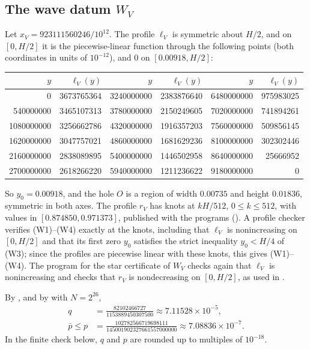 \documentclass[11pt,colorlinks]{charlie}
\begin{document}
\subsection{The wave datum $W_V$}
Let $x_V=923111560246/10^{12}$. The profile $\ell_V$ is symmetric about $H/2$, and on $[0,H/2]$ it is the piecewise-linear function through the following points (both coordinates in units of $10^{-12}$), and $0$ on $[0.00918,H/2]$:
\begin{center}\small
\begin{tabular}{@{}rr@{\quad}rr@{\quad}rr@{}}
\toprule
$y$ & $\ell_V(y)$ & $y$ & $\ell_V(y)$ & $y$ & $\ell_V(y)$\\
\midrule
0 & 3673765364 & 3240000000 & 2383876640 & 6480000000 & 975983025\\
540000000 & 3465107313 & 3780000000 & 2150249605 & 7020000000 & 741894261\\
1080000000 & 3256662786 & 4320000000 & 1916357203 & 7560000000 & 509856145\\
1620000000 & 3047757021 & 4860000000 & 1681629236 & 8100000000 & 302302446\\
2160000000 & 2838089895 & 5400000000 & 1446502958 & 8640000000 & 25666952\\
2700000000 & 2618266220 & 5940000000 & 1211236622 & 9180000000 & 0\\
\bottomrule
\end{tabular}
\end{center}
So $y_0=0.00918$, and the hole $O$ is a region of width $0.00735$ and height $0.01836$, symmetric in both axes. The profile $r_V$ has knots at $kH/512$, $0\le k\le512$, with values in $[0.874850,0.971373]$, published with the programs (). A profile checker verifies (W1)--(W4) exactly at the knots, including that $\ell_V$ is nonincreasing on $[0,H/2]$ and that its first zero $y_0$ satisfies the strict inequality $y_0<H/4$ of (W3); since the profiles are piecewise linear with these knots, this gives (W1)--(W4). The program for the star certificate of $W_V$ checks again that $\ell_V$ is nonincreasing and checks that $r_V$ is nondecreasing on $[0,H/2]$, as used in .

By , and by  with $N=2^{26}$,
\begin{align*}
 q&=\frac{82102466727}{1153889450307500}\approx7.11528\times10^{-5},\\
 \bar p\le p&=\frac{102782566719698111}{145001902327661557000000}\approx7.08836\times10^{-7}.
\end{align*}
In the finite check below, $q$ and $p$ are rounded up to multiples of $10^{-18}$.
\end{document}
